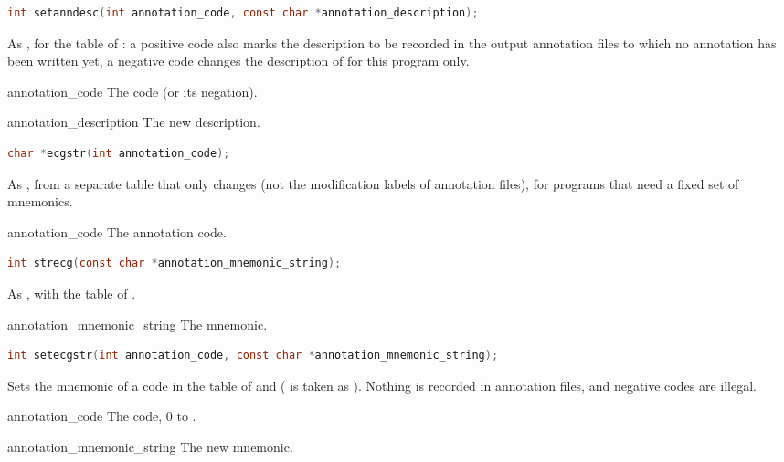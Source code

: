 \begin{lstlisting}[language=C,style=signature]
int setanndesc(int annotation_code, const char *annotation_description);
\end{lstlisting}
As , for the table of : a positive code also
marks the description to be recorded in the output annotation files to which
no annotation has been written yet, a negative code changes the description of  for this
program only.
\begin{params}
\item[annotation\_code] The code (or its negation).
\item[annotation\_description] The new description.
\end{params}

\begin{lstlisting}[language=C,style=signature]
char *ecgstr(int annotation_code);
\end{lstlisting}
As , from a separate table that only  changes
(not the modification labels of annotation files), for programs that need a
fixed set of mnemonics.
\begin{params}
\item[annotation\_code] The annotation code.
\end{params}

\begin{lstlisting}[language=C,style=signature]
int strecg(const char *annotation_mnemonic_string);
\end{lstlisting}
As , with the table of .
\begin{params}
\item[annotation\_mnemonic\_string] The mnemonic.
\end{params}

\begin{lstlisting}[language=C,style=signature]
int setecgstr(int annotation_code, const char *annotation_mnemonic_string);
\end{lstlisting}
Sets the mnemonic of a code in the table of  and 
( is taken as ). Nothing is recorded in annotation files,
and negative codes are illegal.
\begin{params}
\item[annotation\_code] The code, 0 to .
\item[annotation\_mnemonic\_string] The new mnemonic.
\end{params}

